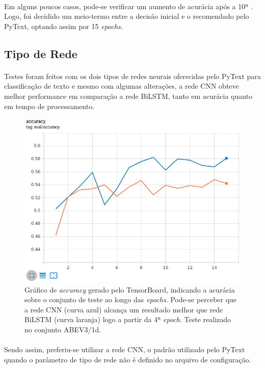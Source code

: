 \documentclass[grad,numbers]{coppe}
\begin{document}
		  	\paragraph{}Em alguns poucos casos, pode-se verificar um aumento de acurácia após a 10ª . Logo, foi decidido um meio-termo entre a decisão inicial e o recomendado pelo PyText, optando assim por 15 \textit{epochs}.
		  \subsection{Tipo de Rede}
			  \paragraph{}Testes foram feitos com os dois tipos de redes neurais oferecidas pelo PyText para classificação de texto e mesmo com algumas alterações, a rede CNN obteve melhor performance em comparação a rede BiLSTM, tanto em acurácia quanto em tempo de processamento.
				\begin{figure}[H]
					\centering
					{\includegraphics[width=13.5cm]{nn-type-graph}
						\caption{Gráfico de \textit{accuracy} gerado pelo TensorBoard, indicando a acurácia sobre o conjunto de teste ao longo das \textit{epochs}. Pode-se perceber que a rede CNN (curva azul) alcança um resultado melhor que rede BiLSTM (curva laranja) logo a partir da 4ª \textit{epoch}. Teste realizado no conjunto ABEV3/1d.}
						\label{fig:nn-type-graph-fig}}
				\end{figure}
			  \paragraph{}Sendo assim, preferiu-se utilizar a rede CNN, o padrão utilizado pelo PyText quando o parâmetro de tipo de rede não é definido no arquivo de configuração.
\end{document}
